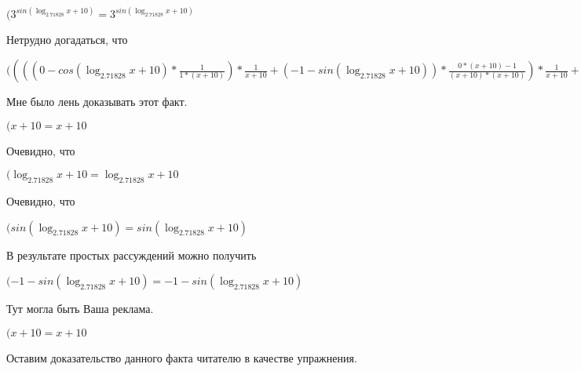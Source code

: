 \documentclass[12pt,a4paper,fleqn]{article}
\theoremstyle{definition}
\begin{document}
$({ 3 }^{sin(\log_{ 2.71828 }{ x  +  10 })} = { 3 }^{sin(\log_{ 2.71828 }{ x  +  10 })}$

Нетрудно догадаться, что

$(((( 0  - cos(\log_{ 2.71828 }{ x  +  10 }) * \frac{ 1 }{ 1  * ( x  +  10 )}
) * \frac{ 1 }{ x  +  10 }
 + ( -1  - sin(\log_{ 2.71828 }{ x  +  10 })) * \frac{ 0  * ( x  +  10 ) -  1 }{( x  +  10 ) * ( x  +  10 )}
) * \frac{ 1 }{ x  +  10 }
 + ( -1  - sin(\log_{ 2.71828 }{ x  +  10 })) * \frac{ 1 }{ x  +  10 }
 * \frac{ 0  * ( x  +  10 ) -  1 }{( x  +  10 ) * ( x  +  10 )}
 + ( -1  - sin(\log_{ 2.71828 }{ x  +  10 })) * \frac{ 1 }{ 1  * ( x  +  10 )}
 * \frac{ -2 }{( x  +  10 ) * ( x  +  10 )}
 + cos(\log_{ 2.71828 }{ x  +  10 }) * \frac{ 0  * ( x  +  10 ) * ( x  +  10 ) -  -2  * ( 1  * ( x  +  10 ) + ( x  +  10 ) *  1 )}{( x  +  10 ) * ( x  +  10 ) * ( x  +  10 ) * ( x  +  10 )}
) * { 3 }^{sin(\log_{ 2.71828 }{ x  +  10 })} = ((( 0  - cos(\log_{ 2.71828 }{ x  +  10 }) * \frac{ 1 }{ 1  * ( x  +  10 )}
) * \frac{ 1 }{ x  +  10 }
 + ( -1  - sin(\log_{ 2.71828 }{ x  +  10 })) * \frac{ 0  * ( x  +  10 ) -  1 }{( x  +  10 ) * ( x  +  10 )}
) * \frac{ 1 }{ x  +  10 }
 + ( -1  - sin(\log_{ 2.71828 }{ x  +  10 })) * \frac{ 1 }{ x  +  10 }
 * \frac{ 0  * ( x  +  10 ) -  1 }{( x  +  10 ) * ( x  +  10 )}
 + ( -1  - sin(\log_{ 2.71828 }{ x  +  10 })) * \frac{ 1 }{ 1  * ( x  +  10 )}
 * \frac{ -2 }{( x  +  10 ) * ( x  +  10 )}
 + cos(\log_{ 2.71828 }{ x  +  10 }) * \frac{ 0  * ( x  +  10 ) * ( x  +  10 ) -  -2  * ( 1  * ( x  +  10 ) + ( x  +  10 ) *  1 )}{( x  +  10 ) * ( x  +  10 ) * ( x  +  10 ) * ( x  +  10 )}
) * { 3 }^{sin(\log_{ 2.71828 }{ x  +  10 })}$

Мне было лень доказывать этот факт.

$( x  +  10  =  x  +  10 $

Очевидно, что

$(\log_{ 2.71828 }{ x  +  10 } = \log_{ 2.71828 }{ x  +  10 }$

Очевидно, что

$(sin(\log_{ 2.71828 }{ x  +  10 }) = sin(\log_{ 2.71828 }{ x  +  10 })$

В результате простых рассуждений можно получить

$( -1  - sin(\log_{ 2.71828 }{ x  +  10 }) =  -1  - sin(\log_{ 2.71828 }{ x  +  10 })$

Тут могла быть Ваша реклама.

$( x  +  10  =  x  +  10 $

Оставим доказательство данного факта читателю в качестве упражнения.
\end{document}

